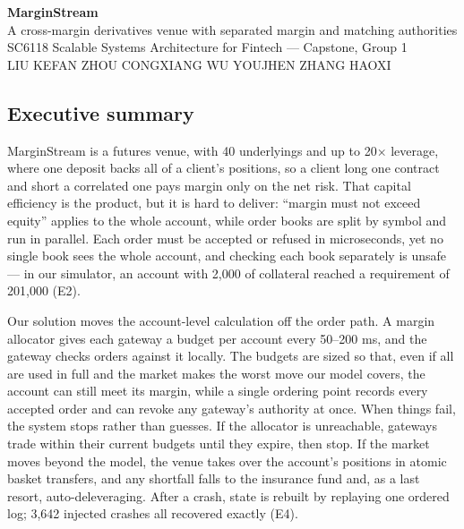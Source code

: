 \documentclass[10pt,a4paper]{article}
\begin{document}
\begin{center}
{\LARGE\bfseries MarginStream}\\[0.4em]
{\large A cross-margin derivatives venue with separated margin and matching
authorities}\\[0.8em]
{\normalsize SC6118 Scalable Systems Architecture for Fintech --- Capstone,
Group 1}\\[0.3em]
{\small LIU KEFAN \quad ZHOU CONGXIANG \quad WU YOUJHEN \quad ZHANG HAOXI}
\end{center}

\vspace{0.6em}
\label{start:0}%

\subsection{Executive summary}\label{executive-summary}

MarginStream is a futures venue, with 40 underlyings and up to 20× leverage, where
one deposit backs all of a client's positions, so a client long one contract and
short a correlated one pays margin only on the net risk. That capital efficiency
is the product, but it is hard to deliver: ``margin must not exceed equity''
applies to the whole account, while order books are split by symbol and run in
parallel. Each order must be accepted or refused in microseconds, yet no single
book sees the whole account, and checking each book separately is unsafe --- in
our simulator, an account with 2,000 of collateral reached a requirement of
201,000 (E2).

Our solution moves the account-level calculation off the order path. A margin
allocator gives each gateway a budget per account every 50--200 ms, and the
gateway checks orders against it locally. The budgets are sized so that, even if
all are used in full and the market makes the worst move our model covers, the
account can still meet its margin, while a single ordering point records every
accepted order and can revoke any gateway's authority at once. When things fail,
the system stops rather than guesses. If the allocator is unreachable, gateways
trade within their current budgets until they expire, then stop. If the market
moves beyond the model, the venue takes over the account's positions in atomic
basket transfers, and any shortfall falls to the insurance fund and, as a last
resort, auto-deleveraging. After a crash, state is rebuilt by replaying one
ordered log; 3,642 injected crashes all recovered exactly (E4).
\end{document}
